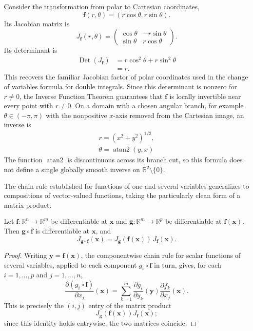 \begin{example}
Consider the transformation from polar to Cartesian coordinates,
\[
\mathbf{f}(r,\theta) = (r\cos\theta, r\sin\theta).
\]
Its Jacobian matrix is
\[
J_{\mathbf{f}}(r,\theta) = \begin{pmatrix} \cos\theta & -r\sin\theta \\ \sin\theta & r\cos\theta \end{pmatrix}.
\]
Its determinant is
\[
\begin{aligned}
\operatorname{Det}(J_{\mathbf{f}}) &= r\cos^2\theta + r\sin^2\theta \\[0.5em]
&= r.
\end{aligned}
\]
This recovers the familiar Jacobian factor of polar coordinates used in the change of variables formula for double integrals. Since this determinant is nonzero for $r \neq 0$, the Inverse Function Theorem guarantees that $\mathbf{f}$ is locally invertible near every point with $r \neq 0$. On a domain with a chosen angular branch, for example $\theta\in(-\pi,\pi)$ with the nonpositive $x$-axis removed from the Cartesian image, an inverse is
\[
\begin{gathered}
r = (x^2+y^2)^{1/2}, \\[0.5em]
\theta = \operatorname{atan2}(y,x)
\end{gathered}
\]
The function $\operatorname{atan2}$ is discontinuous across its branch
cut, so this formula does not define a single globally smooth inverse on
$\mathbb{R}^2\setminus\{0\}$.
\end{example}

The chain rule established for functions of one and several variables generalizes to compositions of vector-valued functions, taking the particularly clean form of a matrix product.

\begin{theorem}
Let $\mathbf{f} : \mathbb{R}^n \to \mathbb{R}^m$ be differentiable at $\mathbf{x}$ and $\mathbf{g} : \mathbb{R}^m \to \mathbb{R}^p$ be differentiable at $\mathbf{f}(\mathbf{x})$. Then $\mathbf{g} \circ \mathbf{f}$ is differentiable at $\mathbf{x}$, and
\[
J_{\mathbf{g} \circ \mathbf{f}}(\mathbf{x}) = J_{\mathbf{g}}(\mathbf{f}(\mathbf{x})) \, J_{\mathbf{f}}(\mathbf{x}).
\]

\end{theorem}

\begin{proof}
Writing $\mathbf{y} = \mathbf{f}(\mathbf{x})$, the componentwise chain rule for scalar functions of several variables, applied to each component $g_i \circ \mathbf{f}$ in turn, gives, for each $i = 1, \dots, p$ and $j = 1, \dots, n$,
\[
\frac{\partial (g_i \circ \mathbf{f})}{\partial x_j}(\mathbf{x}) = \sum_{k=1}^{m} \frac{\partial g_i}{\partial y_k}(\mathbf{y}) \frac{\partial f_k}{\partial x_j}(\mathbf{x}).
\]
This is precisely the $(i,j)$ entry of the matrix product
\[
J_{\mathbf{g}}(\mathbf{f}(\mathbf{x})) J_{\mathbf{f}}(\mathbf{x});
\]
since this identity holds entrywise, the two matrices coincide.
\end{proof}

